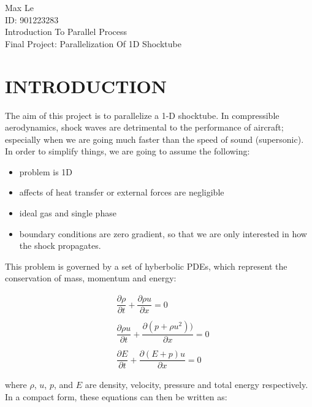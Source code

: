 \documentclass[12pt]{article}
\begin{document}
	\begin{flushleft}
		Max Le \\
		ID: 901223283\\
		Introduction To Parallel Process\\
        Final Project: Parallelization Of 1D Shocktube 
    \end{flushleft}

    \tableofcontents
    \newpage

    \section{INTRODUCTION}

    The aim of this project is to parallelize a 1-D shocktube.  In compressible aerodynamics, shock waves are detrimental to the performance of aircraft; especially when we are going much faster than the speed of sound (supersonic). In order to simplify things, we are going to assume the following: 

    \begin{itemize}
        \item problem is 1D
        \item affects of heat transfer or external forces are negligible 
        \item ideal gas and single phase
        \item boundary conditions are zero gradient, so that we are only interested in how the shock propagates.         
    \end{itemize}
    \noindent
    This problem is governed by a set of hyberbolic PDEs, which represent the conservation of mass, momentum and energy: 
    
    \begin{equation}
        \begin{aligned}
            &\dfrac{\partial \rho}{\partial t} + \dfrac{\partial \rho u }{\partial x} = 0 \\ \\ 
            &\dfrac{\partial \rho u}{\partial t} + \dfrac{\partial (p+\rho u^2)) }{\partial x} = 0 \\ \\ 
            &\dfrac{\partial E}{\partial t} + \dfrac{\partial (E+p)u }{\partial x} = 0
        \end{aligned}        
    \end{equation}

    \noindent
    where $\rho$, $u$, $p$, and $E$ are density, velocity, pressure and total energy respectively. In a compact form, these equations can then be written as:
\end{document}
